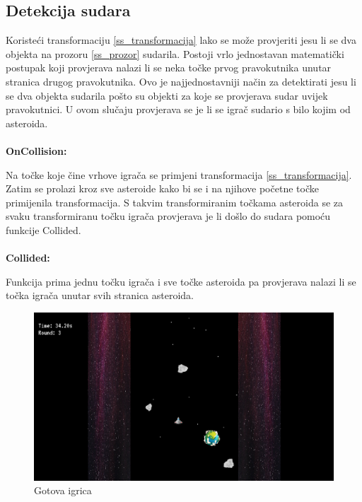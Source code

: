\documentclass{mathos}
\begin{document}
\subsection{Detekcija sudara}
Koristeći transformaciju  \ref{ss_transformacija} lako se može provjeriti jesu li se dva objekta na prozoru \ref{ss_prozor} sudarila. Postoji vrlo jednostavan matematički postupak
koji provjerava nalazi li se neka točke prvog pravokutnika unutar stranica drugog pravokutnika. Ovo je najjednostavniji način za detektirati jesu li se dva objekta sudarila pošto
su objekti za koje se provjerava sudar uvijek pravokutnici. U ovom slučaju provjerava se je li se igrač sudario s bilo kojim od asteroida.
\\ \\
\textbf{OnCollision: }

Na točke koje čine vrhove igrača se primjeni transformacija  \ref{ss_transformacija}. Zatim se prolazi kroz sve asteroide kako bi se i na njihove početne točke primijenila transformacija.
S takvim transformiranim točkama asteroida se za svaku transformiranu točku igrača provjerava je li došlo do sudara pomoću funkcije Collided.
\\ \\
\textbf{Collided: }

Funkcija prima jednu točku igrača i sve točke asteroida pa provjerava nalazi li se točka igrača unutar svih stranica asteroida.

\begin{figure}[H]
    \begin{center}
        \includegraphics[scale=0.4]{Slike/Game.png}
        \caption{Gotova igrica}
        \label{im_Game}
    \end{center}
\end{figure}
\end{document}
